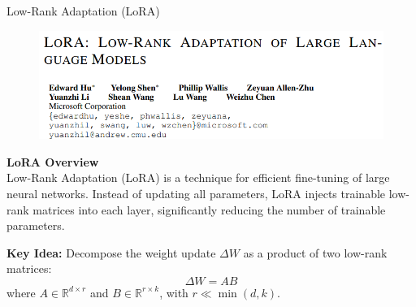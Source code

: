 \begin{frame}[allowframebreaks]{Low-Rank Adaptation (LoRA)}
\begin{figure}
    \centering
    \includegraphics[width=\linewidth,height=\textheight,keepaspectratio]{images/adv-img-gen/lora-1.png}
\end{figure}

\framebreak

\large \textbf{LoRA Overview}\\[0.5ex]
Low-Rank Adaptation (LoRA) is a technique for efficient fine-tuning of large neural networks. Instead of updating all parameters, LoRA injects trainable low-rank matrices into each layer, significantly reducing the number of trainable parameters.

\textbf{Key Idea:} Decompose the weight update $\Delta W$ as a product of two low-rank matrices:
\begin{equation}
    \Delta W = A B
\end{equation}
where $A \in \mathbb{R}^{d \times r}$ and $B \in \mathbb{R}^{r \times k}$, with $r \ll \min(d, k)$.

\framebreak


\end{frame}
